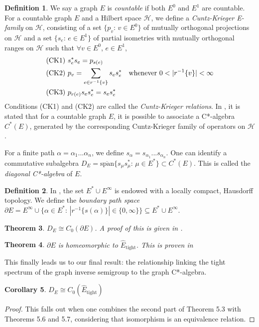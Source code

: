 \documentclass[12pt]{article}
\newtheorem{theorem}{Theorem}[section]
\newtheorem{corollary}[theorem]{Corollary}
\theoremstyle{definition}
\newtheorem{definition}[theorem]{Definition}
\begin{document}
\begin{definition} \parencite[Chapter 5]{raeburn}
    We say a graph $E$ is \emph{countable} if both $E^0$ and $E^1$ are countable.
    For a countable graph $E$ and a Hilbert space $\mathcal{H}$, we define
    a \emph{Cuntz-Krieger E-family} on $\mathcal{H}$, consisting of a set 
    $\{p_v\text{: } v \in E^0\}$ of mutually orthogonal projections on $\mathcal{H}$
    and a set $\{s_e\text{: } e \in E^1\}$ of partial isometries with mutually orthogonal ranges
    on $\mathcal{H}$ such that $\forall v \in E^0$, $e \in E^1$,
    \begin{align*}
        &\text{(CK1) } s_e^* s_e = p_{s(e)} \\
        &\text{(CK2) } p_v = \sum_{e \in r^{-1}\{v\}} s_e s_e^* \text{\quad whenever } 0 < |r^{-1}\{v\}| < \infty \\
        &\text{(CK3) } p_{r(e)} s_e s_e^* = s_e s_e^*
    \end{align*}
    Conditions (CK1) and (CK2) are called the \emph{Cuntz-Krieger relations}.
    In \parencite[Definition 1]{infgraphs}, it is stated that for a countable graph $E$, 
    it is possible to associate a C*-algebra $C^*(E)$, generated by the corresponding Cuntz-Krieger
    family of operators on $\mathcal{H}$.
\end{definition} 
For a finite path $\alpha = \alpha_1 ... \alpha_n$, we define $s_\alpha = s_{\alpha_1} ... s_{\alpha_n}$.
One can identify a commutative subalgebra $D_E = \overline{\text{span}}\{s_\mu s_\mu^*\text{: } \mu \in E^*\} \subset C^*(E)$.
This is called the \emph{diagonal C*-algebra} of $E$.

\begin{definition}
    In \cite[Theorem 2.1]{webster}, the set $E^* \cup E^\infty$ is endowed with
    a locally compact, Hausdorff topology. We define the \emph{boundary path space}
    $\partial E = E^\infty \cup \{\alpha \in E^*\text{: } |r^{-1}\{s(\alpha)\}| \in \{0, \infty\}\} \subseteq E^* \cup E^\infty$.
\end{definition}

\begin{theorem} $D_E \cong C_0(\partial E)$. \emph{A proof of this is given in \cite[Theorem 3.7]{webster}.} \end{theorem}

\begin{theorem} $\partial E$ is homeomorphic to $\hat{E}_\text{tight}$. \emph{This is proven in \cite[Example 6.8]{boava}} \end{theorem}

This finally leads us to our final result: the relationship linking the tight 
spectrum of the graph inverse semigroup to the graph C*-algebra.
\begin{corollary} $D_E \cong C_0(\hat{E}_\text{tight})$ \end{corollary}
\begin{proof}
    This falls out when one combines the second part of Theorem 5.3 with Theorems 5.6 and 5.7,
    considering that isomorphism is an equivalence relation.
\end{proof}

\printbibliography
\end{document}

